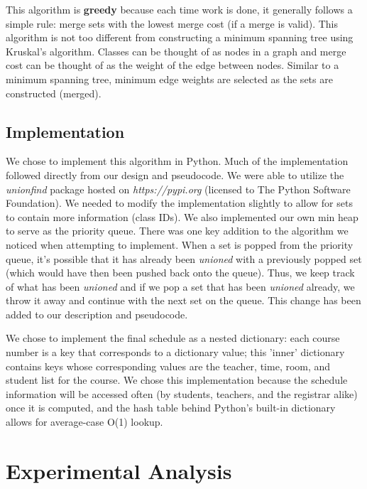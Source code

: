\documentclass[11pt, oneside]{article}   	%
\begin{document}
This algorithm is {\bf greedy} because each time work is done, it generally follows a simple rule: merge sets with the lowest merge cost (if a merge is valid). This algorithm is not too different from constructing a minimum spanning tree using Kruskal's algorithm. Classes can be thought of as nodes in a graph and merge cost can be thought of as the weight of the edge between nodes. Similar to a minimum spanning tree, minimum edge weights are selected as the sets are constructed (merged). 

\subsection{Implementation}
We chose to implement this algorithm in Python. Much of the implementation followed directly from our design and pseudocode. We were able to utilize the {\it unionfind} package hosted on {\it https://pypi.org} (licensed to The Python Software Foundation). We needed to modify the implementation slightly to allow for sets to contain more information (class IDs). We also implemented our own min heap to serve as the priority queue. There was one key addition to the algorithm we noticed when attempting to implement. When a set is popped from the priority queue, it's possible that it has already been {\it unioned} with a previously popped set (which would have then been pushed back onto the queue). Thus, we keep track of what has been {\it unioned} and if we pop a set that has been {\it unioned} already, we throw it away and continue with the next set on the queue. This change has been added to our description and pseudocode.

We chose to implement the final schedule as a nested dictionary: each course number is a key that corresponds to a dictionary value; this 'inner' dictionary contains keys whose corresponding values are the teacher, time, room, and student list for the course. We chose this implementation because the schedule information will be accessed often (by students, teachers, and the registrar alike) once it is computed, and the hash table behind Python's built-in dictionary allows for average-case O(1) lookup. 

\section{Experimental Analysis}
\end{document}
